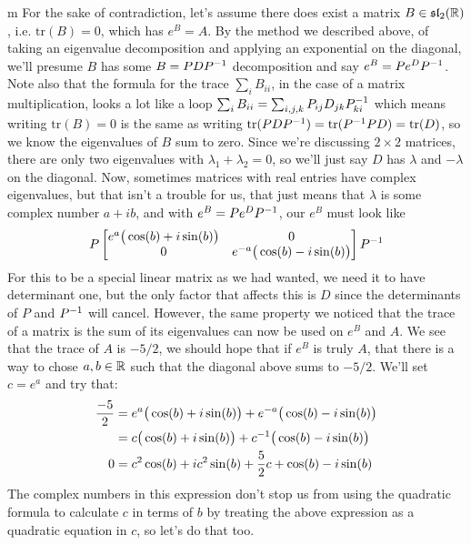 \documentclass[11pt]{article}
\begin{document}
\begin{my proof}{m}
For the sake of contradiction, let's assume there does exist a matrix $B \in \mathfrak{sl}_2(\mathbb{R})$, i.e. $\mathrm{tr}(B) = 0$, which has $e^B = A$. By the method we described above, of taking an eigenvalue decomposition and applying an exponential on the diagonal, we'll presume $B$ has some $B = P D P^{-1}$ decomposition and say $e^B = P e^D P^{-1}$. Note also that the formula for the trace $\sum_i B_{ii}$, in the case of a matrix multiplication, looks a lot like a loop $\sum_i B_{ii} = \sum_{i,j,k} P_{ij} D_{jk} P^{-1}_{ki}$ which means writing $\mathrm{tr}(B) = 0$ is the same as writing $\mathrm{tr}(PDP^{-1}) = \mathrm{tr}(P^{-1} P D) = \mathrm{tr}(D)$, so we know the eigenvalues of $B$ sum to zero. Since we're discussing $2\times 2$ matrices, there are only two eigenvalues with $\lambda_1 + \lambda_2 = 0$, so we'll just say $D$ has $\lambda$ and $-\lambda$ on the diagonal. Now, sometimes matrices with real entries have complex eigenvalues, but that isn't a trouble for us, that just means that $\lambda$ is some complex number $a + ib$, and with $e^B = P e^D P^{-1}$, our $e^B$ must look like \begin{gather*}
P\begin{bmatrix}
e^a \big(\cos(b) + i \sin(b) \big) & 0 \\
0 & e^{-a} \big(\cos(b) - i \sin(b) \big)
\end{bmatrix} P^{-1}
\end{gather*}
For this to be a special linear matrix as we had wanted, we need it to have determinant one, but the only factor that affects this is $D$ since the determinants of $P$ and $P^{-1}$ will cancel. However, the same property we noticed that the trace of a matrix is the sum of its eigenvalues can now be used on $e^B$ and $A$. We see that the trace of $A$ is $-5/2$, we should hope that if $e^B$ is truly $A$, that there is a way to chose $a,b \in \mathbb{R}$ such that the diagonal above sums to $-5/2$. We'll set $c = e^a$ and try that: \begin{align*}
\frac{-5}{2} &= e^a \big(\cos(b) + i \sin(b) \big) + e^{-a} \big(\cos(b) - i \sin(b) \big) \\
&= c \big(\cos(b) + i \sin(b) \big) + c^{-1} \big(\cos(b) - i \sin(b) \big) \\
0 &= c^2 \cos(b) + i c^2 \sin(b) + \frac{5}{2}c + \cos(b) - i\sin(b)
\end{align*}
The complex numbers in this expression don't stop us from using the quadratic formula to calculate $c$ in terms of $b$ by treating the above expression as a quadratic equation in $c$, so let's do that too. \begin{gather*}

\end{gather*}
\end{my proof}
\end{document}
